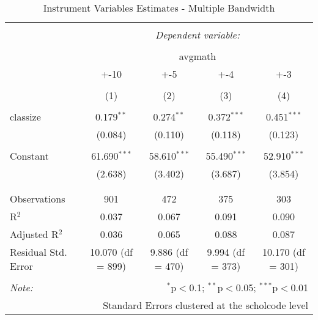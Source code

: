 
\begin{table}[!htbp] \centering 
  \caption{Instrument Variables Estimates - Multiple Bandwidth} 
  \label{} 
\begin{tabular}{@{\extracolsep{5pt}}lcccc} 
\\[-1.8ex]\hline 
\hline \\[-1.8ex] 
 & \multicolumn{4}{c}{\textit{Dependent variable:}} \\ 
\cline{2-5} 
\\[-1.8ex] & \multicolumn{4}{c}{avgmath} \\ 
 & +-10 & +-5 & +-4 & +-3 \\ 
\\[-1.8ex] & (1) & (2) & (3) & (4)\\ 
\hline \\[-1.8ex] 
 classize & 0.179$^{**}$ & 0.274$^{**}$ & 0.372$^{***}$ & 0.451$^{***}$ \\ 
  & (0.084) & (0.110) & (0.118) & (0.123) \\ 
  & & & & \\ 
 Constant & 61.690$^{***}$ & 58.610$^{***}$ & 55.490$^{***}$ & 52.910$^{***}$ \\ 
  & (2.638) & (3.402) & (3.687) & (3.854) \\ 
  & & & & \\ 
\hline \\[-1.8ex] 
Observations & 901 & 472 & 375 & 303 \\ 
R$^{2}$ & 0.037 & 0.067 & 0.091 & 0.090 \\ 
Adjusted R$^{2}$ & 0.036 & 0.065 & 0.088 & 0.087 \\ 
Residual Std. Error & 10.070 (df = 899) & 9.886 (df = 470) & 9.994 (df = 373) & 10.170 (df = 301) \\ 
\hline 
\hline \\[-1.8ex] 
\textit{Note:}  & \multicolumn{4}{r}{$^{*}$p$<$0.1; $^{**}$p$<$0.05; $^{***}$p$<$0.01} \\ 
 & \multicolumn{4}{r}{Standard Errors clustered at the scholcode level} \\ 
\end{tabular} 
\end{table} 
